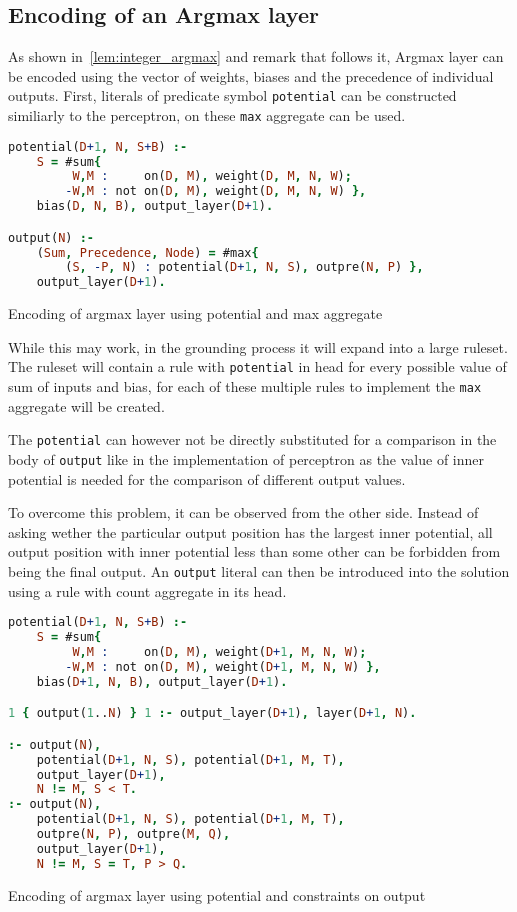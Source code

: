 \subsection{Encoding of an Argmax layer}

As shown in~\cref{lem:integer_argmax} and remark that follows it, Argmax layer can
be encoded using the vector of weights, biases and the precedence of individual outputs.
First, literals of predicate symbol \texttt{potential} can be constructed similiarly
to the perceptron, on these \texttt{max} aggregate can be used.

\begin{code}
\begin{lstlisting}[language=Prolog, numbers=none]
potential(D+1, N, S+B) :-
    S = #sum{
         W,M :     on(D, M), weight(D, M, N, W);
        -W,M : not on(D, M), weight(D, M, N, W) },
    bias(D, N, B), output_layer(D+1).

output(N) :-
    (Sum, Precedence, Node) = #max{
        (S, -P, N) : potential(D+1, N, S), outpre(N, P) },
    output_layer(D+1).
\end{lstlisting}
    \caption{Encoding of argmax layer using potential and max aggregate}\label{enc:argmax_max}
\end{code}

While this may work, in the grounding process it will expand into a large ruleset.
The ruleset will contain a rule with \texttt{potential} in head for every
possible value of sum of inputs and bias, for each of these multiple rules
to implement the \texttt{max} aggregate will be created.

The \texttt{potential} can however not be directly substituted for a comparison
in the body of \texttt{output} like in the implementation of perceptron
as the value of inner potential is needed for the comparison of different output values.

To overcome this problem, it can be observed from the other side.
Instead of asking wether the particular output position has the largest inner potential,
all output position with inner potential less than some other can be forbidden from being
the final output. An \texttt{output} literal can then be introduced into the solution
using a rule with count aggregate in its head.

\begin{code}
\begin{lstlisting}[language=Prolog, numbers=none]
potential(D+1, N, S+B) :-
    S = #sum{
         W,M :     on(D, M), weight(D+1, M, N, W);
        -W,M : not on(D, M), weight(D+1, M, N, W) },
    bias(D+1, N, B), output_layer(D+1).

1 { output(1..N) } 1 :- output_layer(D+1), layer(D+1, N).

:- output(N),
    potential(D+1, N, S), potential(D+1, M, T),
    output_layer(D+1),
    N != M, S < T.
:- output(N),
    potential(D+1, N, S), potential(D+1, M, T),
    outpre(N, P), outpre(M, Q),
    output_layer(D+1),
    N != M, S = T, P > Q.
\end{lstlisting}
    \caption{Encoding of argmax layer using potential and constraints on output}\label{enc:argmax_potential_pm1}
\end{code}

